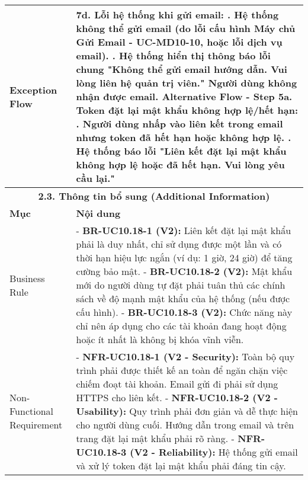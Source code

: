 \begin{longtable}{|m{4cm}|p{11cm}|}
\hline
Exception Flow & \textbf{7d. Lỗi hệ thống khi gửi email:} \newline    1. Hệ thống không thể gửi email (do lỗi cấu hình Máy chủ Gửi Email - UC-MD10-10, hoặc lỗi dịch vụ email). \newline    2. Hệ thống hiển thị thông báo lỗi chung "Không thể gửi email hướng dẫn. Vui lòng liên hệ quản trị viên." Người dùng không nhận được email. \newline \textbf{Alternative Flow - Step 5a. Token đặt lại mật khẩu không hợp lệ/hết hạn:} \newline    1. Người dùng nhấp vào liên kết trong email nhưng token đã hết hạn hoặc không hợp lệ. \newline    2. Hệ thống báo lỗi "Liên kết đặt lại mật khẩu không hợp lệ hoặc đã hết hạn. Vui lòng yêu cầu lại." \\
\hline
\multicolumn{2}{|c|}{\textbf{2.3. Thông tin bổ sung (Additional Information)}} \\
\hline
\textbf{Mục} & \textbf{Nội dung} \\
\hline
Business Rule & - \textbf{BR-UC10.18-1 (V2):} Liên kết đặt lại mật khẩu phải là duy nhất, chỉ sử dụng được một lần và có thời hạn hiệu lực ngắn (ví dụ: 1 giờ, 24 giờ) để tăng cường bảo mật. \newline - \textbf{BR-UC10.18-2 (V2):} Mật khẩu mới do người dùng tự đặt phải tuân thủ các chính sách về độ mạnh mật khẩu của hệ thống (nếu được cấu hình). \newline - \textbf{BR-UC10.18-3 (V2):} Chức năng này chỉ nên áp dụng cho các tài khoản đang hoạt động hoặc ít nhất là không bị khóa vĩnh viễn. \\
\hline
Non-Functional Requirement & - \textbf{NFR-UC10.18-1 (V2 - Security):} Toàn bộ quy trình phải được thiết kế an toàn để ngăn chặn việc chiếm đoạt tài khoản. Email gửi đi phải sử dụng HTTPS cho liên kết. \newline - \textbf{NFR-UC10.18-2 (V2 - Usability):} Quy trình phải đơn giản và dễ thực hiện cho người dùng cuối. Hướng dẫn trong email và trên trang đặt lại mật khẩu phải rõ ràng. \newline - \textbf{NFR-UC10.18-3 (V2 - Reliability):} Hệ thống gửi email và xử lý token đặt lại mật khẩu phải đáng tin cậy. \\
\hline
\end{longtable}

